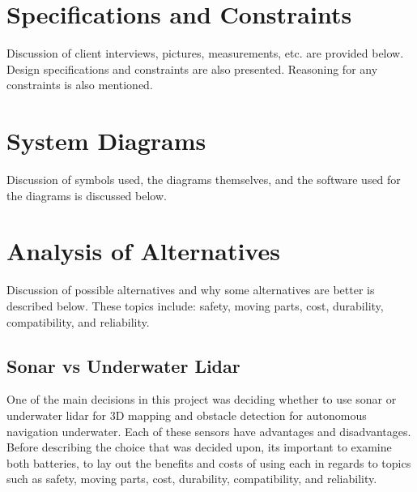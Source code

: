 \documentclass[12pt]{article}
\begin{document}
			\clearpage	
	
	\section{Specifications and Constraints}
	Discussion of client interviews, pictures, measurements, etc. are provided below. Design specifications and constraints are also presented. Reasoning for any constraints is also mentioned. 
	
	\newpage
						
	\section{System Diagrams}
	Discussion of symbols used, the diagrams themselves, and the software used for the diagrams is discussed below.
	
	\newpage				
					
	\section{Analysis of Alternatives}
	Discussion of possible alternatives and why some alternatives are better is described below. These topics include: safety, moving parts, cost, durability, compatibility, and reliability. 
	
		\subsection{Sonar vs Underwater Lidar}
		One of the main decisions in this project was deciding whether to use sonar or underwater lidar for 3D mapping and obstacle detection for autonomous navigation underwater. Each of these sensors have advantages and disadvantages. Before describing the choice that was decided upon, its important to examine both batteries, to lay out the benefits and costs of using each in regards to topics such as safety, moving parts, cost, durability, compatibility, and reliability.\\
			
\end{document}
